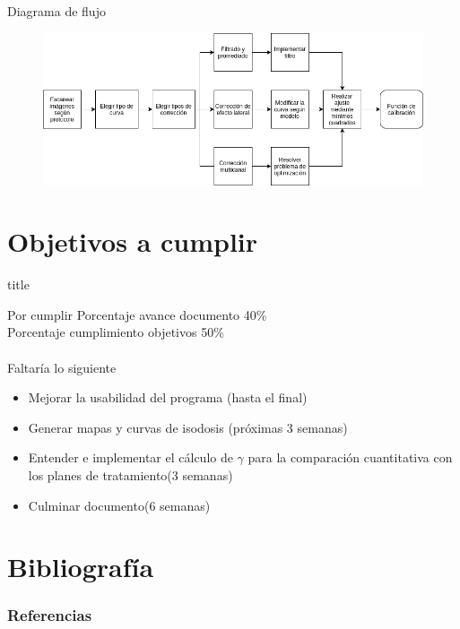 \documentclass[12pt]{beamer}
\begin{document}
\begin{frame}{Diagrama de flujo}
\begin{figure}
	\centering
	\includegraphics[width=\linewidth]{images/daigramaFlujo.png}
\end{figure}
\end{frame}






\section{Objetivos a cumplir}
\begin{frame}
\vfill
\centering
\begin{beamercolorbox}[sep=8pt,center,shadow=true,rounded=true]{title}
	\insertsectionhead\par%
\end{beamercolorbox}
\vfill
\end{frame}

\begin{frame}{Por cumplir}
Porcentaje avance documento 40\% \\
Porcentaje cumplimiento objetivos 50\%\\~\\
Faltaría lo siguiente
\begin{itemize}
	\item Mejorar la usabilidad del programa (hasta el final)
	\item Generar mapas y curvas de isodosis (próximas 3 semanas)
	\item Entender e implementar el cálculo de $\gamma$ para la comparación cuantitativa con los planes de tratamiento(3 semanas)
	\item Culminar documento(6 semanas)
\end{itemize}
\end{frame}



\section{Bibliografía}
\begin{frame}[allowframebreaks]
\frametitle{Referencias}
\nocite{*}


\end{frame}
\end{document}
